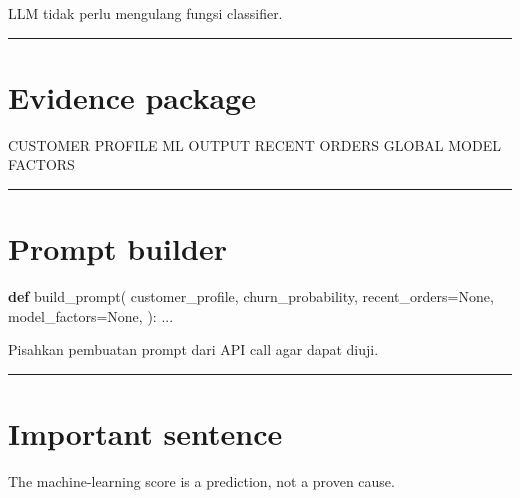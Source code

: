\documentclass[
  indonesian,
  letterpaper,
  DIV=11,
  numbers=noendperiod]{scrreprt}
\newenvironment{Shaded}{\begin{snugshade}}{\end{snugshade}}
\newcommand{\KeywordTok}[1]{\textcolor[rgb]{0.00,0.23,0.31}{\textbf{#1}}}
\newcommand{\NormalTok}[1]{\textcolor[rgb]{0.00,0.23,0.31}{#1}}
\newcommand{\OperatorTok}[1]{\textcolor[rgb]{0.37,0.37,0.37}{#1}}
\newcommand{\VariableTok}[1]{\textcolor[rgb]{0.07,0.07,0.07}{#1}}
\begin{document}
LLM tidak perlu mengulang fungsi classifier.

\begin{center}\rule{0.5\linewidth}{0.5pt}\end{center}

\section{Evidence package}\label{evidence-package}

\begin{Shaded}
\begin{Highlighting}[]
\NormalTok{CUSTOMER PROFILE}
\NormalTok{ML OUTPUT}
\NormalTok{RECENT ORDERS}
\NormalTok{GLOBAL MODEL FACTORS}
\end{Highlighting}
\end{Shaded}

\begin{center}\rule{0.5\linewidth}{0.5pt}\end{center}

\section{Prompt builder}\label{prompt-builder}

\begin{Shaded}
\begin{Highlighting}[]
\KeywordTok{def}\NormalTok{ build\_prompt(}
\NormalTok{    customer\_profile,}
\NormalTok{    churn\_probability,}
\NormalTok{    recent\_orders}\OperatorTok{=}\VariableTok{None}\NormalTok{,}
\NormalTok{    model\_factors}\OperatorTok{=}\VariableTok{None}\NormalTok{,}
\NormalTok{):}
\NormalTok{    ...}
\end{Highlighting}
\end{Shaded}

Pisahkan pembuatan prompt dari API call agar dapat diuji.

\begin{center}\rule{0.5\linewidth}{0.5pt}\end{center}

\section{Important sentence}\label{important-sentence}

\begin{Shaded}
\begin{Highlighting}[]
\NormalTok{The machine{-}learning score is a prediction,}
\NormalTok{not a proven cause.}
\end{Highlighting}
\end{Shaded}
\end{document}
